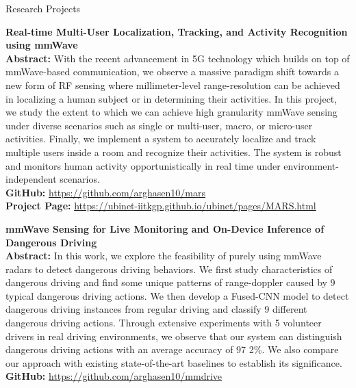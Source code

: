 \documentclass{resume} %
\begin{document}
	\begin{rSection}{Research Projects}
		\begin{rSubsection}{}{}{}{}
			\item \textbf{Real-time Multi-User Localization, Tracking, and Activity Recognition using mmWave}\\
			\textbf{Abstract:} With the recent advancement in 5G technology which builds on top of mmWave-based communication, we observe a massive paradigm shift towards a new form of RF sensing where millimeter-level range-resolution can be achieved in localizing a human subject or in determining their activities. In this project, we study the extent to which we can achieve high granularity mmWave sensing under diverse scenarios such as single or multi-user, macro, or micro-user activities. Finally, we implement a system to accurately localize and track multiple users inside a room and recognize their activities. The system is robust and monitors human activity opportunistically in real time under environment-independent scenarios. \\
			\textbf{GitHub:} \url{https://github.com/arghasen10/mars}\\
			\textbf{Project Page:} \url{https://ubinet-iitkgp.github.io/ubinet/pages/MARS.html}
			
			\item \textbf{mmWave Sensing for Live Monitoring and On-Device Inference of Dangerous Driving}\\
			\textbf{Abstract:} In this work, we explore the feasibility of purely using mmWave radars to detect dangerous driving behaviors. We first study characteristics of dangerous driving and find some unique patterns of range-doppler caused by 9 typical dangerous driving actions. We then develop a Fused-CNN model to detect dangerous driving instances from regular driving and classify 9 different dangerous driving actions. Through extensive experiments with 5 volunteer drivers in real driving environments, we observe that our system can distinguish dangerous driving actions with an average accuracy of 97
			2\%. We also compare our approach with existing state-of-the-art baselines to establish its significance. \\
			\textbf{GitHub:} \url{https://github.com/arghasen10/mmdrive}
			
			
		\end{rSubsection}
	\end{rSection}
	
\end{document}
